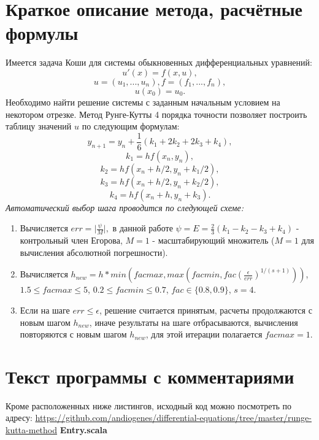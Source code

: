 \documentclass[a4paper,12pt]{article}
\begin{document}
\section{\normalsize{Краткое описание метода, расчётные формулы}}
\begin{flushleft}
    Имеется задача Коши для системы обыкновенных дифференциальных уравнений:
    \[u'(x) = f(x, u),\]\[u = (u_1, ..., u_n), f = (f_1, ..., f_n),\]\[u(x_0) = u_0.\]
    Необходимо найти решение системы с заданным начальным условием на некотором отрезке.
    \linebreak\linebreak
    Метод Рунге-Кутты 4 порядка точности позволяет построить таблицу значений $u$ по следующим формулам:
    \[y_{n+1} = y_n + \frac{1}{6}(k_1 + 2 k_2 + 2 k_3 + k_4),\]
    \[k_1 = hf(x_n, y_n),\]
    \[k_2 = hf(x_n + h/2, y_n + k_1/2),\]
    \[k_3 = hf(x_n + h/2, y_n + k_2/2),\]
    \[k_4 = hf(x_n + h,y_n + k_3).\]
    \linebreak
    \textit{Автоматический выбор шага проводится по следующей схеме:}
    \begin{enumerate}
      \item Вычисляется \(err = \mathopen|\frac{\psi}{M}\mathclose|,\) в данной работе \(\psi = E = \frac{2}{3}(k_1 - k_2 - k_3 + k_4)\) - контрольный член Егорова, \(M = 1\) - масштабирующий множитель (\(M = 1\) для вычисления абсолютной погрешности).
      \item Вычисляется \(h_{new} = h * min(facmax, max(facmin, fac(\frac{\epsilon}{err})^{1/(s+1)}))\), \(1.5 \le facmax \le 5\), \(0.2 \le facmin \le 0.7\), \(fac \in \{0.8, 0.9\}\), \(s = 4\).
      \item Если на шаге \(err \le \epsilon\), решение считается принятым, расчеты продолжаются с новым шагом $h_{new}$, иначе результаты на шаге отбрасываются, вычисления повторяются с новым шагом $h_{new}$, для этой итерации полагается $facmax = 1$.
    \end{enumerate}
\end{flushleft}


\section{\normalsize{Текст программы с комментариями}}
Кроме расположенных ниже листингов, исходный код можно посмотреть по адресу: \url{https://github.com/andiogenes/differential-equations/tree/master/runge-kutta-method}
\linebreak\linebreak\textbf{Entry.scala}
\inputminted[breaklines]{scala}{../src/main/scala/Entry.scala}
\end{document}
